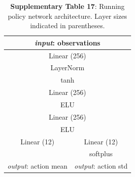 \documentclass[sn-mathphys-num]{sn-jnl}%
\theoremstyle{thmstyleone}%
\theoremstyle{thmstyletwo}%
\theoremstyle{thmstylethree}%
\begin{document}
\begin{appendices}
\begin{table}[htbp]
	\centering
	\small
	\caption{\textbf{Supplementary Table 17}:
		Running policy network architecture. 
		Layer sizes indicated in parentheses.
	}
	\begin{tabular}{cc}
		\toprule
		\multicolumn{2}{c}{\textit{input}: observations}             \\
		\midrule
		\multicolumn{2}{c}{Linear (256)}        \\
		\multicolumn{2}{c}{LayerNorm}      \\
		\multicolumn{2}{c}{tanh}     \\
		\multicolumn{2}{c}{Linear (256)}      \\
		\multicolumn{2}{c}{ELU}       \\
		\multicolumn{2}{c}{Linear (256)}       \\
		\multicolumn{2}{c}{ELU}      \\
		\midrule
		Linear (12)     &  Linear (12)  \\
		     &  softplus \\
		\textit{output}: action mean     &  \textit{output}: action std  \\
		\bottomrule
	\end{tabular}%
	\label{tab:s_17}%
\end{table}%






\end{appendices}
\end{document}
